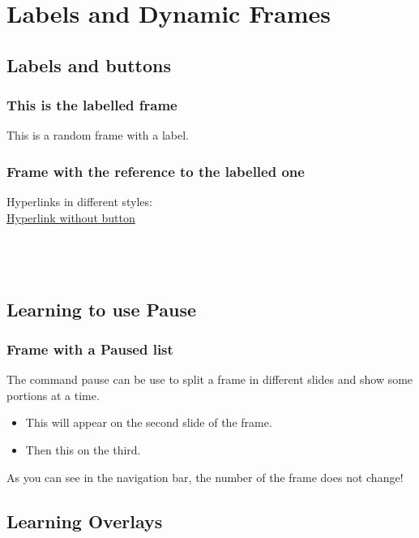 \section{Labels and Dynamic Frames}

\subsection{Labels and buttons}

\begin{frame}
    \label{FrameToGo}
    \frametitle{This is the labelled frame}
    This is a random frame with a label.
\end{frame}

\begin{frame}
    \frametitle{Frame with the reference to the labelled one}
    Hyperlinks in different styles:\\
    \centering
    \hyperlink{FrameToGo}{Hyperlink without button}\\
    \hyperlink{FrameToGo}{}\\
    \hyperlink{FrameToGo}{}\\
    \hyperlink{FrameToGo}{}\\
    \hyperlink{FrameToGo}{}
\end{frame}

\subsection{Learning to use Pause}

\begin{frame}
    \frametitle{Frame with a Paused list}
    The command pause can be use to split a frame in different slides and show some portions at a time.
    \begin{itemize}
        \pause
        \item This will appear on the second slide of the frame.
        \pause
        \item Then this on the third.
    \end{itemize}
    As you can see in the navigation bar, the number of the frame does not change!
\end{frame}

\subsection{Learning Overlays}

